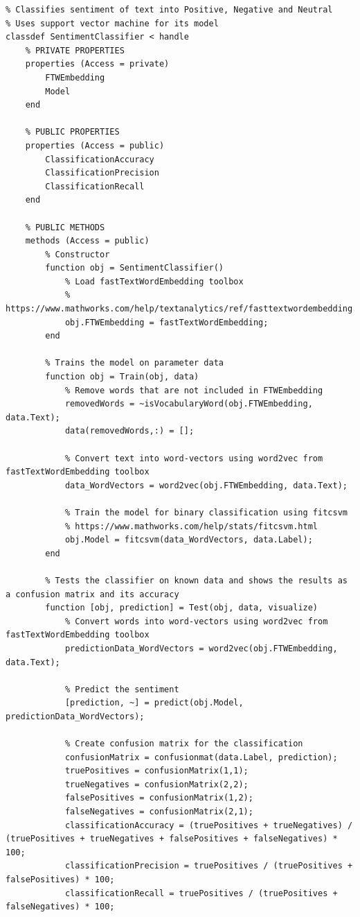 \documentclass[12pt,journal,compsoc]{IEEEtran}
\begin{document}
\begin{lstlisting}[basicstyle=\small, breaklines=true, postbreak=\mbox{\textcolor{red}{$\hookrightarrow$}\space}]
% Sentiment classifier class
% Classifies sentiment of text into Positive, Negative and Neutral
% Uses support vector machine for its model
classdef SentimentClassifier < handle
    % PRIVATE PROPERTIES
    properties (Access = private)
        FTWEmbedding
        Model
    end

    % PUBLIC PROPERTIES
    properties (Access = public)
        ClassificationAccuracy
        ClassificationPrecision
        ClassificationRecall
    end

    % PUBLIC METHODS
    methods (Access = public)
        % Constructor
        function obj = SentimentClassifier()
            % Load fastTextWordEmbedding toolbox
            % https://www.mathworks.com/help/textanalytics/ref/fasttextwordembedding.html
            obj.FTWEmbedding = fastTextWordEmbedding;
        end

        % Trains the model on parameter data
        function obj = Train(obj, data)
            % Remove words that are not included in FTWEmbedding
            removedWords = ~isVocabularyWord(obj.FTWEmbedding, data.Text);
            data(removedWords,:) = [];

            % Convert text into word-vectors using word2vec from fastTextWordEmbedding toolbox
            data_WordVectors = word2vec(obj.FTWEmbedding, data.Text);

            % Train the model for binary classification using fitcsvm
            % https://www.mathworks.com/help/stats/fitcsvm.html
            obj.Model = fitcsvm(data_WordVectors, data.Label);
        end

        % Tests the classifier on known data and shows the results as a confusion matrix and its accuracy
        function [obj, prediction] = Test(obj, data, visualize)
            % Convert words into word-vectors using word2vec from fastTextWordEmbedding toolbox
            predictionData_WordVectors = word2vec(obj.FTWEmbedding, data.Text);
            
            % Predict the sentiment
            [prediction, ~] = predict(obj.Model, predictionData_WordVectors);

            % Create confusion matrix for the classification
            confusionMatrix = confusionmat(data.Label, prediction);
            truePositives = confusionMatrix(1,1);
            trueNegatives = confusionMatrix(2,2);
            falsePositives = confusionMatrix(1,2);
            falseNegatives = confusionMatrix(2,1);
            classificationAccuracy = (truePositives + trueNegatives) / (truePositives + trueNegatives + falsePositives + falseNegatives) * 100;
            classificationPrecision = truePositives / (truePositives + falsePositives) * 100;
            classificationRecall = truePositives / (truePositives + falseNegatives) * 100;


\end{lstlisting}
\end{document}
